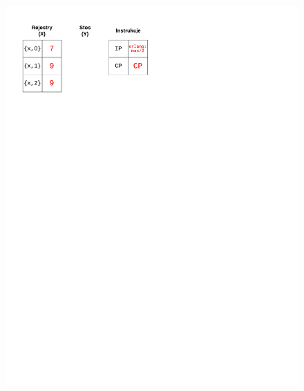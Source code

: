\begin{figure}
\begin{multicols}{2}
\vspace{-4mm}
\begin{Figure}
 \centering
 \includegraphics[scale=0.65, clip, trim=0 215mm 110mm 0]{interpreter_max_7}
\label{fig:max7}
\end{Figure}


\end{multicols}
\end{figure}

